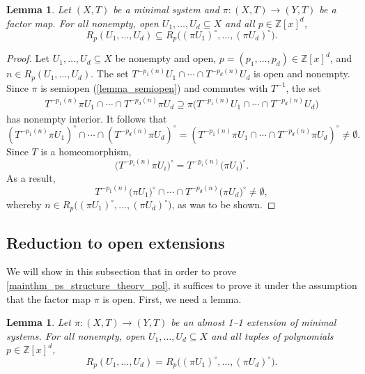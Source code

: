 \documentclass{article}
\theoremstyle{plain}
\newtheorem{lemma}[Theorem]{Lemma}
\theoremstyle{claim}
\theoremstyle{definition}
\theoremstyle{plain}
\theoremstyle{plain}
\newcommand{\Z}{\mathbb{Z}}
\newcommand{\1}{\boldsymbol{1}}
\begin{document}
\begin{lemma}
\label{lemma_containment_in_one_direction}
    Let $(X,T)$ be a minimal system and $\pi: (X,T) \to (Y,T)$ be a factor map.  For all nonempty, open $U_1, \ldots, U_d \subseteq X$ and all $p \in \Z[x]^d$,
    \[R_p(U_1,\ldots,U_d) \subseteq R_p\big((\pi U_1)^\circ, \ldots, (\pi U_d)^\circ\big).\]
\end{lemma}

\begin{proof}
    Let $U_1, \ldots, U_d \subseteq X$ be nonempty and open, $p = (p_1, \ldots, p_d) \in \Z[x]^d$, and $n \in R_p(U_1, \ldots, U_d)$.  The set $T^{-p_1(n)}U_1 \cap \cdots \cap T^{-p_d(n)}U_d$ is open and nonempty.
    Since $\pi$ is semiopen (\cref{lemma_semiopen}) and commutes with $T^{-1}$, the set
    \begin{align*}
        T^{-p_1(n)} \pi U_1 \cap \cdots \cap T^{-p_d(n)}\pi U_d
        \supseteq \pi \big( T^{-p_1(n)}U_1 \cap \cdots \cap T^{-p_d(n)}U_d \big)
    \end{align*}
    has nonempty interior.  It follows that
    \[
        (T^{-p_1(n)} \pi U_1)^\circ \cap \cdots \cap (T^{-p_d(n)}\pi U_d)^\circ = (T^{-p_1(n)} \pi U_1 \cap \cdots \cap T^{-p_d(n)}\pi U_d)^\circ \neq \emptyset.
    \]
    Since $T$ is a homeomorphism,
    \[
        \big(T^{-p_i(n)} \pi U_i \big)^{\circ} = T^{-p_i(n)} \big( \pi U_i \big)^{\circ}.
    \]
    As a result,
    \[
        T^{-p_1(n)}\big(\pi U_1 \big)^\circ \cap \cdots \cap T^{-p_d(n)}\big(\pi U_d \big)^\circ \neq \emptyset,
    \]
    whereby $n \in R_p\big( (\pi U_1)^\circ, \ldots, (\pi U_d)^\circ \big)$, as was to be shown.
\end{proof}

\subsection{Reduction to open extensions}
\label{sec_reduction_to_open}

We will show in this subsection that in order to prove \cref{mainthm_ps_structure_theory_pol}, it suffices to prove it under the assumption that the factor map $\pi$ is open. First, we need a lemma.

\begin{lemma}
\label{lemma_multiple_set_returns_lift_in_almost_11_extensions}
Let $\pi: (X,T) \to (Y,T)$ be an almost 1--1 extension of minimal systems.  For all nonempty, open $U_1, \ldots, U_d \subseteq X$ and all tuples of polynomials $p \in \Z[x]^d$,
\[
R_p(U_1,\ldots,U_d) = R_p\big((\pi U_1)^\circ, \ldots, (\pi U_d)^\circ\big).
\]
\end{lemma}
\end{document}
